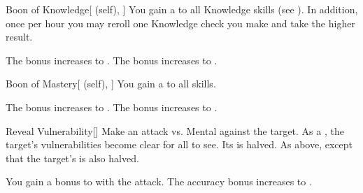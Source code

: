\lowercase{\hypertarget{spell:Boon of Knowledge}{}}\label{spell:Boon of Knowledge}
\begin{attuneability}[Rank 4]{\hypertarget{spell:Boon of Knowledge}{Boon of Knowledge}}[ (self), ]
You gain a   to all Knowledge skills (see ).
In addition, once per hour you may reroll one Knowledge check you make and take the higher result.

\rankline
{} The bonus increases to .
 The bonus increases to .

\end{attuneability}
\vspace{0.25em}



\lowercase{\hypertarget{spell:Boon of Mastery}{}}\label{spell:Boon of Mastery}
\begin{attuneability}[Rank 4]{\hypertarget{spell:Boon of Mastery}{Boon of Mastery}}[ (self), ]
You gain a   to all skills.

\rankline
{} The bonus increases to .
 The bonus increases to .

\end{attuneability}
\vspace{0.25em}



\lowercase{\hypertarget{spell:Reveal Vulnerability}{}}\label{spell:Reveal Vulnerability}
\begin{freeability}[Rank 4]{\hypertarget{spell:Reveal Vulnerability}{Reveal Vulnerability}}[]
Make an attack vs. Mental against the target.
\hit As a , the target's vulnerabilities become clear for all to see.
Its  is halved.
\crit As above, except that the target's  is also halved.

\rankline
{} You gain a  bonus to  with the attack.
 The accuracy bonus increases to .

\end{freeability}
\vspace{0.25em}



